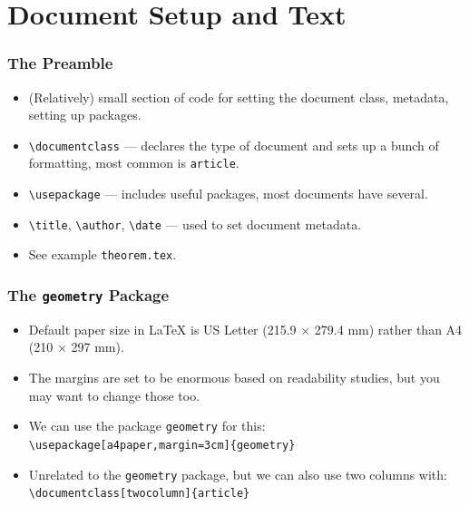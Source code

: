 \documentclass{beamer}
\begin{document}
\section{Document Setup and Text}

\begin{frame}
	\frametitle{The Preamble}
	\begin{itemize}
		\item (Relatively) small section of code for setting the document class, metadata, setting up packages.
		\item \texttt{\textbackslash{}documentclass} --- declares the type of document and sets up a bunch of formatting, most common is \texttt{article}.
		\item \texttt{\textbackslash{}usepackage} --- includes useful packages, most documents have several.
		\item \texttt{\textbackslash{}title}, \texttt{\textbackslash{}author}, \texttt{\textbackslash{}date} --- used to set document metadata.
		\item See example \texttt{theorem.tex}.
	\end{itemize}
\end{frame}

\begin{frame}
	\frametitle{The \texttt{geometry} Package}
	\begin{itemize}
		\item Default paper size in \LaTeX{} is US Letter (215.9 $\times$ 279.4 mm) rather than A4 (210 $\times$ 297 mm).
		\item The margins are set to be enormous based on readability studies, but you may want to change those too.
		\item We can use the package \texttt{geometry} for this:\\\texttt{\textbackslash{}usepackage[a4paper,margin=3cm]\{geometry\}}
		\item Unrelated to the \texttt{geometry} package, but we can also use two columns with:\\\texttt{\textbackslash{}documentclass[twocolumn]\{article\}}
	\end{itemize}
\end{frame}
\end{document}
